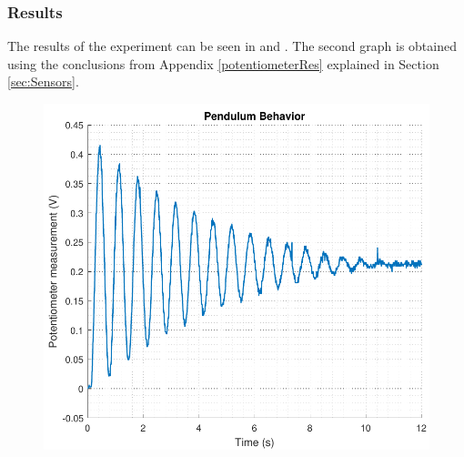 \subsubsection{Results}
The results of the experiment can be seen in  and . The second graph is obtained using the conclusions from Appendix \ref{potentiometerRes} explained in Section \ref{sec:Sensors}.

\begin{minipage}{\linewidth}
	\begin{minipage}{0.45\linewidth}
		\begin{figure}[H]
			\includegraphics[scale=.53]{figures/PendVolt}
			\centering
			\vspace{-.4cm}
			\captionsetup{justification=centering}
			\label{PendVolt}
		\end{figure}%
	\end{minipage}
	\hspace{0.03\linewidth}
	\begin{minipage}{0.45\linewidth}
		\begin{figure}[H]

\end{figure}
\end{minipage}
\end{minipage}
